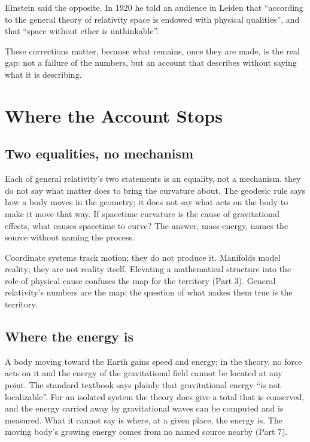  Einstein said the opposite. In 1920 he told an audience in Leiden that ``according to the general theory of relativity space is endowed with physical qualities'', and that ``space without ether is unthinkable''.

These corrections matter, because what remains, once they are made, is the real gap: not a failure of the numbers, but an account that describes without saying what it is describing.

\section{Where the Account Stops}

\subsection{Two equalities, no mechanism}

Each of general relativity's two statements is an equality, not a mechanism.  they do not say what matter does to bring the curvature about. The geodesic rule says how a body moves in the geometry; it does not say what acts on the body to make it move that way. If spacetime curvature is the cause of gravitational effects, what causes spacetime to curve? The answer, mass-energy, names the source without naming the process.

 Coordinate systems track motion; they do not produce it. Manifolds model reality; they are not reality itself. Elevating a mathematical structure into the role of physical cause confuses the map for the territory (Part 3). General relativity's numbers are the map; the question of what makes them true is the territory.

\subsection{Where the energy is}

 A body moving toward the Earth gains speed and energy; in the theory, no force acts on it and the energy of the gravitational field cannot be located at any point. The standard textbook says plainly that gravitational energy ``is not localizable''. For an isolated system the theory does give a total that is conserved, and the energy carried away by gravitational waves can be computed and is measured. What it cannot say is where, at a given place, the energy is. The moving body's growing energy comes from no named source nearby (Part 7).

